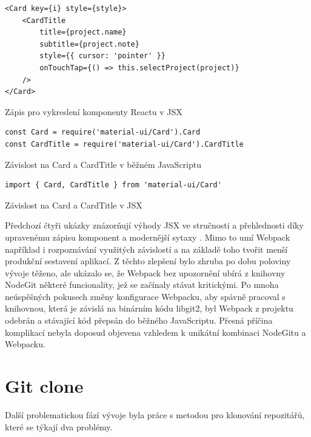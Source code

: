 \begin{listing}[ht]
\begin{verbatim}
<Card key={i} style={style}>
	<CardTitle
		title={project.name}
		subtitle={project.note}
		style={{ cursor: 'pointer' }}
		onTouchTap={() => this.selectProject(project)}
	/>
</Card>
\end{verbatim}
\caption[Komponenta v JSX]{Zápis pro vykreslení komponenty Reactu v JSX}
\end{listing}

\begin{listing}[ht]
	\begin{verbatim}
const Card = require('material-ui/Card').Card
const CardTitle = require('material-ui/Card').CardTitle
	\end{verbatim}
	\caption[Závislosti v JavaScriptu]{Závislost na Card a CardTitle v běžném JavaScriptu}
\end{listing}

\begin{listing}[ht]
	\begin{verbatim}
import { Card, CardTitle } from 'material-ui/Card'
	\end{verbatim}
	\caption[Komponenta v JSX]{Závislost na Card a CardTitle v JSX}
\end{listing}

\FloatBarrier

Předchozí čtyři ukázky znázorňují výhody JSX ve stručnosti a přehlednosti díky upravenému zápisu komponent a modernější sytaxy . Mimo to umí Webpack například i rozpoznávání využitých závislostí a na základě toho tvořit menší produkční sestavení aplikací. Z těchto zlepšení bylo zhruba po dobu poloviny vývoje těženo, ale ukázalo se, že Webpack bez upozornění ubírá z knihovny NodeGit některé funcionality, jež se začínaly stávat kritickými. Po mnoha neúspěšných pokusech změny konfigurace Webpacku, aby spávně pracoval s knihovnou, která je závislá na binárním kódu libgit2, byl Webpack z projektu odebrán a stávající kód přepsán do běžného JavaScriptu. Přesná příčina komplikací nebyla doposud objevena vzhledem k unikátní kombinaci NodeGitu a Webpacku.

\section{Git clone}

Další problematickou fází vývoje byla práce s metodou pro klonování repozitářů, které se týkají dva problémy.

